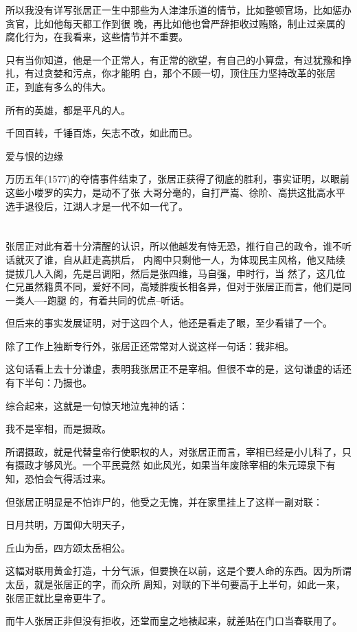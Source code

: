 \documentclass[11pt,a4paper,onecolumn]{article}
\begin{document}
所以我没有详写张居正一生中那些为人津津乐道的情节，比如整顿官场，比如惩办贪官，比如他每天都工作到很
晚，再比如他也曾严辞拒收过贿赂，制止过亲属的腐化行为，在我看来，这些情节并不重要。

只有当你知道，他是一个正常人，有正常的欲望，有自己的小算盘，有过犹豫和挣扎，有过贪婪和污点，你才能明
白，那个不顾一切，顶住压力坚持改革的张居正，到底有多么的伟大。

所有的英雄，都是平凡的人。

千回百转，千锤百炼，矢志不改，如此而已。

爱与恨的边缘

万历五年(1577)的夺情事件结束了，张居正获得了彻底的胜利，事实证明，以眼前这些小喽罗的实力，是动不了张
大哥分毫的，自打严嵩、徐阶、高拱这批高水平选手退役后，江湖人才是一代不如一代了。

\section[\thesection]{}

张居正对此有着十分清醒的认识，所以他越发有恃无恐，推行自己的政令，谁不听话就灭了谁，自从赶走高拱后，
内阁中只剩他一人，为体现民主风格，他又陆续提拔几人入阁，先是吕调阳，然后是张四维，马自强，申时行，当
然了，这几位仁兄虽然籍贯不同，爱好不同，高矮胖瘦长相各异，但对于张居正而言，他们是同一类人----跑腿
的，有着共同的优点--听话。

但后来的事实发展证明，对于这四个人，他还是看走了眼，至少看错了一个。

除了工作上独断专行外，张居正还常常对人说这样一句话：我非相。

这句话看上去十分谦虚，表明我张居正不是宰相。但很不幸的是，这句谦虚的话还有下半句：乃摄也。

综合起来，这就是一句惊天地泣鬼神的话：

我不是宰相，而是摄政。

所谓摄政，就是代替皇帝行使职权的人，对张居正而言，宰相已经是小儿科了，只有摄政才够风光。一个平民竟然
如此风光，如果当年废除宰相的朱元璋泉下有知，恐怕会气得活过来。

但张居正明显是不怕诈尸的，他受之无愧，并在家里挂上了这样一副对联：

日月共明，万国仰大明天子，

丘山为岳，四方颂太岳相公。

这幅对联用黄金打造，十分气派，但要换在以前，这是个要人命的东西。因为所谓太岳，就是张居正的字，而众所
周知，对联的下半句要高于上半句，如此一来，张居正就比皇帝更牛了。

而牛人张居正非但没有拒收，还堂而皇之地裱起来，就差贴在门口当春联用了。
\end{document}
